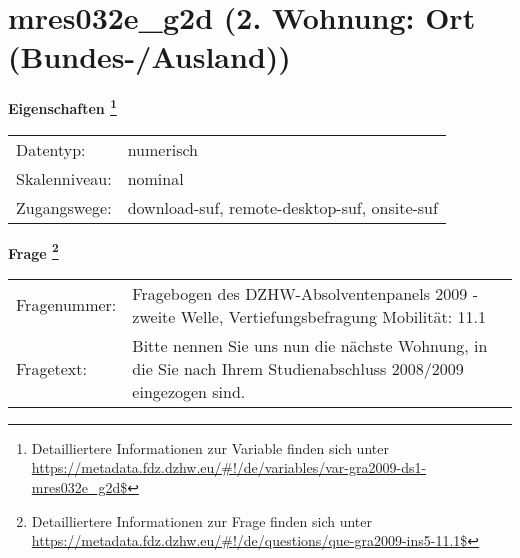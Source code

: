 
    \setcounter{footnote}{0}

    \vspace*{-1.8cm}
	\section{mres032e\_g2d (2. Wohnung: Ort (Bundes-/Ausland))}
	\label{section:mres032e_g2d}



    \vspace*{0.5cm}
    \noindent\textbf{Eigenschaften
	\footnote{Detailliertere Informationen zur Variable finden sich unter
		\url{https://metadata.fdz.dzhw.eu/\#!/de/variables/var-gra2009-ds1-mres032e_g2d$}}}\\
	\begin{tabularx}{\hsize}{@{}lX}
	Datentyp: & numerisch \\
	Skalenniveau: & nominal \\
	Zugangswege: &
	  download-suf, 
	  remote-desktop-suf, 
	  onsite-suf
 \\
    \end{tabularx}



				\vspace*{0.5cm}
                \noindent\textbf{Frage
	                \footnote{Detailliertere Informationen zur Frage finden sich unter
		              \url{https://metadata.fdz.dzhw.eu/\#!/de/questions/que-gra2009-ins5-11.1$}}}\\
				\begin{tabularx}{\hsize}{@{}lX}
					Fragenummer: &
					  Fragebogen des DZHW-Absolventenpanels 2009 - zweite Welle, Vertiefungsbefragung Mobilität:
					  11.1
 \\
					Fragetext: & Bitte nennen Sie uns nun die nächste Wohnung, in die Sie nach Ihrem Studienabschluss 2008/2009 eingezogen sind. \\
				\end{tabularx}





